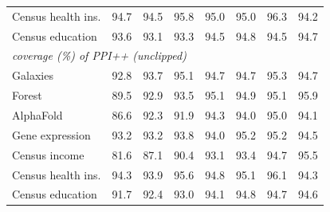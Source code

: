 \begin{tabular}{lrrrrrrr}
Census health ins. & 94.7 & 94.5 & 95.8 & 95.0 & 95.0 & 96.3 & 94.2\\
Census education & 93.6 & 93.1 & 93.3 & 94.5 & 94.8 & 94.5 & 94.7\\
\midrule
\multicolumn{8}{l}{\emph{coverage (\%) of PPI++ (unclipped)}}\\
Galaxies & 92.8 & 93.7 & 95.1 & 94.7 & 94.7 & 95.3 & 94.7\\
Forest & 89.5 & 92.9 & 93.5 & 95.1 & 94.9 & 95.1 & 95.9\\
AlphaFold & 86.6 & 92.3 & 91.9 & 94.3 & 94.0 & 95.0 & 94.1\\
Gene expression & 93.2 & 93.2 & 93.8 & 94.0 & 95.2 & 95.2 & 94.5\\
Census income & 81.6 & 87.1 & 90.4 & 93.1 & 93.4 & 94.7 & 95.5\\
Census health ins. & 94.3 & 93.9 & 95.6 & 94.8 & 95.1 & 96.1 & 94.3\\
Census education & 91.7 & 92.4 & 93.0 & 94.1 & 94.8 & 94.7 & 94.6\\
\bottomrule
\end{tabular}